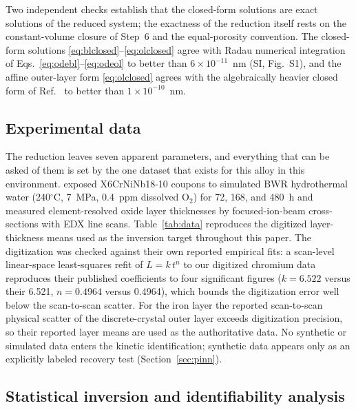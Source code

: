 \documentclass[a4paper,fleqn]{cas-sc}
\begin{document}
Two independent checks establish that the closed-form solutions are
exact solutions of the reduced system; the exactness of the reduction
itself rests on the constant-volume closure of Step~6 and the
equal-porosity convention. The closed-form solutions
\eqref{eq:blclosed}--\eqref{eq:olclosed} agree with Radau numerical
integration of Eqs.~\eqref{eq:odebl}--\eqref{eq:odeol} to better than
$6\times10^{-11}$~nm (SI, Fig.~S1), and the affine outer-layer form
\eqref{eq:olclosed} agrees with the algebraically heavier closed form of
Ref.~\citep{li2020scwpdm} to better than $1\times10^{-10}$~nm.

\subsection{Experimental data}\label{sec:data}

The reduction leaves seven apparent parameters, and everything that can
be asked of them is set by the one dataset that exists for this alloy in
this environment. \citet{veile2024} exposed X6CrNiNb18-10 coupons to
simulated BWR hydrothermal water (240$^\circ$C, 7~MPa, 0.4~ppm dissolved
O$_2$) for 72, 168, and 480~h and measured element-resolved oxide layer
thicknesses by focused-ion-beam cross-sections with EDX line scans.
Table~\ref{tab:data} reproduces the digitized layer-thickness means used
as the inversion target throughout this paper. The digitization
was checked against their own reported empirical fits: a scan-level
linear-space least-squares refit of $L = k\,t^n$ to our digitized
chromium data reproduces their published coefficients to four
significant figures ($k = 6.522$ versus their 6.521, $n = 0.4964$
versus 0.4964), which bounds the digitization error well below the
scan-to-scan scatter. For the iron layer the reported scan-to-scan
physical scatter of the discrete-crystal outer layer exceeds
digitization precision, so their reported layer means are used as the
authoritative data. No synthetic or simulated data enters the
kinetic identification; synthetic data appears only as an explicitly
labeled recovery test (Section~\ref{sec:pinn}).

\subsection{Statistical inversion and identifiability analysis}\label{sec:stats}
\end{document}
